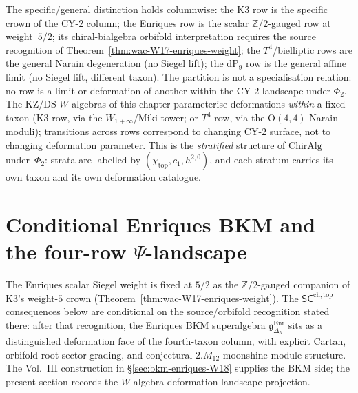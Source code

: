 \begin{remark}
\label{rem:wac-W17-specific-vs-general}
The specific/general distinction holds columnwise:
the K3 row is the specific crown of the CY-$2$ column; the
Enriques row is the scalar $\mathbb{Z}/2$-gauged row at
weight~$5/2$; its chiral-bialgebra orbifold interpretation requires
the source recognition of Theorem~\ref{thm:wac-W17-enriques-weight};
the $T^4$/bielliptic rows are the general Narain
degeneration (no Siegel lift); the $\mathrm{dP}_9$ row is the
general affine limit (no Siegel lift, different taxon). The
partition is not a specialisation relation: no row is a limit
or deformation of another within the CY-$2$ landscape under
$\Phi_2$. The KZ/DS $W$-algebras of this chapter
parameterise deformations \emph{within} a fixed taxon (K3
row, via the $W_{1+\infty}$/Miki tower; or $T^4$ row, via the
$\mathrm{O}(4,4)$ Narain moduli); transitions across rows
correspond to changing CY-$2$ surface, not to changing
deformation parameter. This is the \emph{stratified} structure
of $\mathrm{ChirAlg}$ under~$\Phi_2$: strata are labelled by
$(\chi_{\mathrm{top}}, c_1, h^{2,0})$, and each stratum carries
its own taxon and its own deformation catalogue.
\end{remark}

\section{Conditional Enriques BKM and the four-row $\Psi$-landscape}
\label{sec:wac-supplement-iv}

The Enriques scalar Siegel weight is fixed at $5/2$ as the
$\mathbb{Z}/2$-gauged companion of K3's weight-$5$ crown
(Theorem~\ref{thm:wac-W17-enriques-weight}). The
$\mathsf{SC}^{\mathrm{ch,top}}$ consequences below are conditional on
the source/orbifold recognition stated there: after that recognition,
the Enriques BKM superalgebra
$\mathfrak{g}_{\Delta_5}^{\mathrm{Enr}}$ sits as a distinguished
deformation face of the fourth-taxon column, with explicit Cartan,
orbifold root-sector grading, and conjectural
$2.M_{12}$-moonshine module structure. The Vol.~III construction in
\S\ref{sec:bkm-enriques-W18} supplies the BKM side; the present section records the
$W$-algebra deformation-landscape projection.

